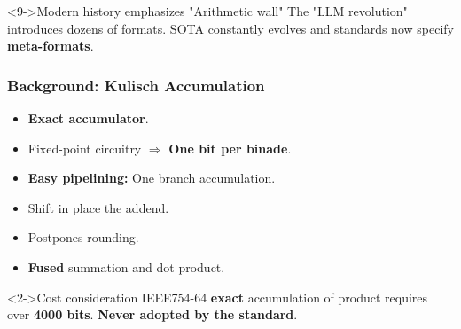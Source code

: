 \begin{frame}[t]
{\begin{myenumerate}
\end{myenumerate}

\normalsize
{}

}
	\begin{alertblock}<9->{Modern history emphasizes "Arithmetic wall"}
		The "LLM revolution" introduces dozens of formats. SOTA constantly evolves and standards now specify \textbf{meta-formats}.
	\end{alertblock}
\end{frame}

\begin{frame}
    \frametitle{Background: Kulisch Accumulation}

        \begin{itemize}
	   \item<1-> \textbf{Exact accumulator}.
	   \item<1-> Fixed-point circuitry $\Rightarrow$ \textbf{One bit per binade}.
	   \item<1-> \textbf{Easy pipelining:} One branch accumulation.
           \item<1-> Shift in place the addend.
           \item<1-> Postpones rounding.
	   \item<1-> \textbf{Fused} summation and dot product.
        \end{itemize}
	\begin{block}<2->{Cost consideration}
		IEEE754-64 \textbf{exact} accumulation of product requires over \textbf{4000 bits}.
		\textbf{Never adopted by the standard}.
	\end{block}

\end{frame}

